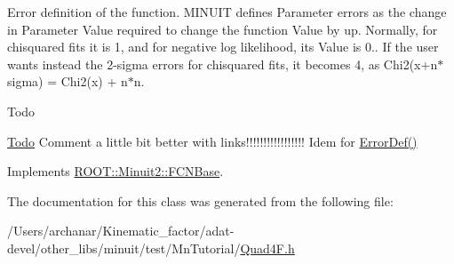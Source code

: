 Error definition of the function. M\+I\+N\+U\+IT defines Parameter errors as the change in Parameter Value required to change the function Value by up. Normally, for chisquared fits it is 1, and for negative log likelihood, its Value is 0.. If the user wants instead the 2-\/sigma errors for chisquared fits, it becomes 4, as Chi2(x+n$\ast$sigma) = Chi2(x) + n$\ast$n.

\begin{DoxyRefDesc}{Todo}
\item[\mbox{\hyperlink{todo__todo000001}{Todo}}]Comment a little bit better with links!!!!!!!!!!!!!!!!! Idem for \mbox{\hyperlink{classROOT_1_1Minuit2_1_1FCNBase_ac4592475c58a65b037ba97ab5f3cba10}{Error\+Def()}}\end{DoxyRefDesc}


Implements \mbox{\hyperlink{classROOT_1_1Minuit2_1_1FCNBase_a04ef08ddad92ce8d89d498efbe021c39}{R\+O\+O\+T\+::\+Minuit2\+::\+F\+C\+N\+Base}}.



The documentation for this class was generated from the following file\+:\begin{DoxyCompactItemize}
\item 
/\+Users/archanar/\+Kinematic\+\_\+factor/adat-\/devel/other\+\_\+libs/minuit/test/\+Mn\+Tutorial/\mbox{\hyperlink{adat-devel_2other__libs_2minuit_2test_2MnTutorial_2Quad4F_8h}{Quad4\+F.\+h}}\end{DoxyCompactItemize}
